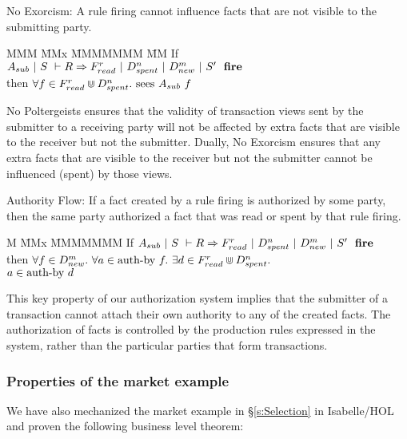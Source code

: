 \begin{theorem}
No Exorcism: A rule firing cannot influence facts that are not visible to the submitting party.
\end{theorem}
\begin{tabbing}
MMM \= MMx \= MMMMMMM \= MM \kill
\> If     \> $A_{sub}~|~S~\vdash R \Rightarrow F_{read}^r~|~D_{spent}^n~|~D_{new}^m~|~S'~~\textbf{fire}$ \\
\> then   \> $\forall f \in F_{read}^r \Cup D_{spent}^n.\ \textrm{sees}~ A_{sub}~ f$
\end{tabbing}

No Poltergeists ensures that the validity of transaction views sent by the submitter to a receiving party will not be affected by extra facts that are visible to the receiver but not the submitter. Dually, No Exorcism ensures that any extra facts that are visible to the receiver but not the submitter cannot be influenced (spent) by those views.


\begin{theorem}
Authority Flow: If a fact created by a rule firing is authorized by some party, then the same party authorized a fact that was read or spent by that rule firing.
\end{theorem}
\begin{tabbing}
M \= MMx \= MMMMMMM \kill
\> If   \> $A_{sub}~|~S~\vdash R \Rightarrow F_{read}^r~|~D_{spent}^n~|~D_{new}^m~|~S'~~\textbf{fire}$ \\
\> then \> $\forall f \in D_{new}^m.\
            \forall a \in \textrm{auth-by}~f.\
            \exists d \in F_{read}^r \Cup D_{spent}^n.$ \\
\>      \> \hspace{1em}$a \in \textrm{auth-by}~d$
\end{tabbing}

This key property of our authorization system implies that the submitter of a transaction cannot attach their own authority to any of the created facts. The authorization of facts is controlled by the production rules expressed in the system, rather than the particular parties that form transactions.


\eject{}
\subsubsection{Properties of the market example}
We have also mechanized the market example in \S\ref{s:Selection} in Isabelle/HOL and proven the following business level theorem:

